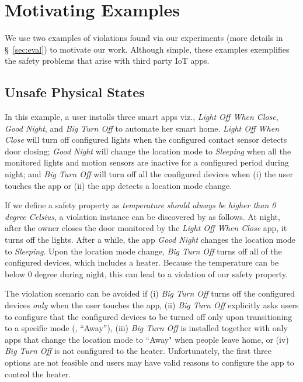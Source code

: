 \section{Motivating Examples}
\label{sec:motivation}
{\color{black}We use two examples of violations found via our experiments (more details in \S~\ref{sec:eval}) to motivate our work.
Although simple, these examples exemplifies the safety problems that arise with third party IoT apps.

\subsection{Unsafe Physical States} In this example, a user installs three smart apps viz., \textit{Light Off When Close}, \textit{Good Night},
and \textit{Big Turn Off} to automate her smart home.
\textit{Light Off When Close} will turn off
configured lights when the configured contact sensor detects door closing;
\textit{Good Night} will change the location mode to \textit{Sleeping}
when all the monitored lights and motion sensors are inactive for
a configured period during night; and
\textit{Big Turn Off} will turn off all the configured devices
when (i) the user touches the app or (ii) the app detects a location mode change.

If we define a safety property as
\textit{temperature should always be higher than 0 degree Celsius},
a violation instance can be discovered by \sys as follows.
At night, after the owner closes the door monitored by
the \textit{Light Off When Close} app, it turns off the lights.
After a while, the app \textit{Good Night} changes the location mode to \textit{Sleeping}.
Upon the location mode change, \textit{Big Turn Off} turns off all of the configured devices,
which includes a heater.
Because the temperature can be below 0 degree during night,
this can lead to a violation of our safety property.

The violation scenario can be avoided if
(i) \textit{Big Turn Off} turns off the configured devices \emph{only} when the user touches the app,
(ii) \textit{Big Turn Off} explicitly asks users to configure that the configured devices to be turned off
only upon transitioning to a specific mode (\eg, ``Away''),
(iii) \textit{Big Turn Off} is installed together with only apps that change
the location mode to ``Away" when people leave home,
or (iv) \textit{Big Turn Off} is not configured to the heater.
Unfortunately, the first three options are not feasible and users may
have valid reasons to configure the app to control the heater.}

